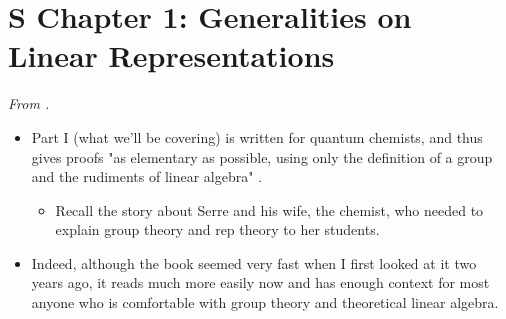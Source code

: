 \documentclass[../notes.tex]{subfiles}
\begin{document}
\section{S Chapter 1: Generalities on Linear Representations}
\emph{From \textcite{bib:Serre}.}
\begin{itemize}
    \item {}Part I (what we'll be covering) is written for quantum chemists, and thus gives proofs "as elementary as possible, using only the definition of a group and the rudiments of linear algebra" \parencite[v]{bib:Serre}.
    \begin{itemize}
        \item Recall the story about Serre and his wife, the chemist, who needed to explain group theory and rep theory to her students.
    \end{itemize}
    \item Indeed, although the book seemed very fast when I first looked at it two years ago, it reads much more easily now and has enough context for most anyone who is comfortable with group theory and theoretical linear algebra.
\end{itemize}
\end{document}
